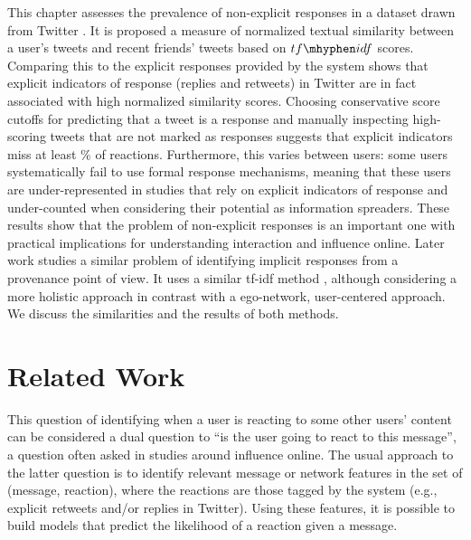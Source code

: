 \color{red}
This chapter assesses the prevalence of non-explicit responses in a dataset drawn from Twitter \cite{BarbosaNeto2013, Barbosa}. It is proposed a measure of normalized textual similarity between a user's tweets and recent friends' tweets based on $tf\mhyphen idf$ scores.  Comparing this to the explicit responses provided by the system shows that explicit indicators of response (replies and retweets) in Twitter are in fact associated with high normalized similarity scores.  Choosing conservative score cutoffs for predicting that a tweet is a response and manually inspecting high-scoring tweets that are not marked as responses suggests that explicit indicators miss at least \highNonTaggedTweetCountPct{}\% of reactions. 
Furthermore, this varies between users: some users systematically fail to use formal response mechanisms, meaning that these users are under-represented in studies that rely on explicit indicators of response and under-counted when considering their potential as information spreaders. These results show that the problem of non-explicit responses is an important one with practical implications for understanding interaction and influence online. 
Later work \cite{taxidou2016} studies a similar problem of identifying implicit responses from a provenance point of view. It uses a similar tf-idf method \cite{de2015}, although considering a more holistic approach in contrast with a ego-network, user-centered approach. We discuss the similarities and the results of both methods.
\color{black}


\section{Related Work}

This question of identifying when a user is reacting to some other users' content can be considered a dual 
question to ``is the user going to react to this message'', a question often asked in studies around influence online. 
The usual approach to the latter question is to identify relevant message or network features in the set of (message, reaction), where the reactions are those tagged by the system (e.g., explicit retweets and/or replies in Twitter).  
Using these features, it is possible to build models that predict the likelihood of a reaction given a message.

